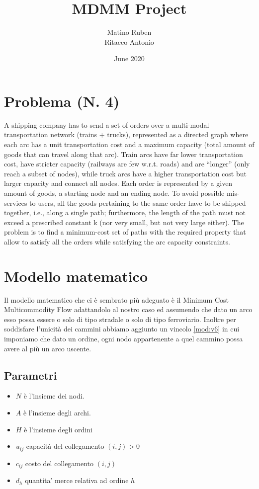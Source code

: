 \documentclass{article}
\title{MDMM Project}
\author{Matino Ruben \\ Ritacco Antonio }
\date{June 2020}
\begin{document}
\maketitle

\section{Problema (N. 4)}

A shipping company has to send a set of orders over a multi-modal transportation network (trains +
trucks), represented as a directed graph where each arc has a unit transportation cost and a
maximum capacity (total amount of goods that can travel along that arc). Train arcs have far lower
transportation cost, have stricter capacity (railways are few w.r.t. roads) and are “longer” (only
reach a subset of nodes), while truck arcs have a higher transportation cost but larger capacity and
connect all nodes. Each order is represented by a given amount of goods, a starting node and an
ending node. To avoid possible mis-services to users, all the goods pertaining to the same order
have to be shipped together, i.e., along a single path; furthermore, the length of the path must not
exceed a prescribed constant k (nor very small, but not very large either). The problem is to find a
minimum-cost set of paths with the required property that allow to satisfy all the orders while
satisfying the arc capacity constraints.


\section{Modello matematico}
Il modello matematico che ci è sembrato più adeguato è il Minimum Cost Multicommodity Flow adattandolo al nostro caso  ed assumendo che dato un arco esso possa essere o solo di tipo stradale o solo di tipo ferroviario. Inoltre per soddisfare l'unicità dei cammini abbiamo aggiunto un vincolo \eqref{mod:v6} in cui imponiamo che dato un ordine, ogni nodo appartenente a quel cammino possa avere al più un arco uscente.
\subsection{Parametri}
\begin{itemize}
    \item \textbf{$N$} è l'insieme dei nodi.
    \item \textbf{$A$} è l'insieme degli archi.
    \item \textbf{$H$} è l'insieme degli ordini
    \item $u_{ij}$ capacità del collegamento $(i,j) > 0$ 
    \item $c_{ij}$ costo del collegamento $(i,j)$
    \item $d_h$ quantita' merce relativa ad ordine $h$
\end{itemize}
\end{document}
